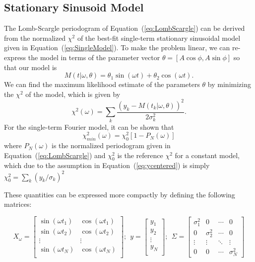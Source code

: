 \documentclass[12pt,preprint]{aastex}
\newcommand{\Eq}[1]{Equation~(\ref{eq:#1})}
\newcommand{\eq}[1]{\Eq{#1}}
\newcommand{\eqlabel}[1]{\label{eq:#1}}
\begin{document}
\subsection{Stationary Sinusoid Model}
The Lomb-Scargle periodogram of \eq{LombScargle} can be derived from the normalized $\chi^2$ of the best-fit single-term stationary sinusoidal model given in \eq{SingleModel}. To make the problem linear, we can re-express the model in terms of the parameter vector $\theta = [A\cos\phi, A\sin\phi]$ so that our model is
\begin{equation}
  \eqlabel{simplemodel}
  M(t|\omega,\theta) = \theta_1\sin(\omega t) + \theta_2\cos(\omega t).
\end{equation}
We can find the maximum likelihood estimate of the parameters $\theta$ by minimizing the $\chi^2$ of the model, which is given by
\begin{equation}
  \chi^2(\omega) = \sum_k \frac{(y_k - M(t_k|\omega,\theta))^2}{2\sigma_k^2}.
\end{equation}
For the single-term Fourier model, it can be shown \citep[See, e.g.][]{ICVG2014} that
\begin{equation}
  \eqlabel{chi2_PN}
  \chi_{min}^2(\omega) = \chi^2_0[1 - P_N(\omega)]
\end{equation}
where $P_N(\omega)$ is the normalized periodogram given in \eq{LombScargle} and $\chi^2_0$ is the reference $\chi^2$ for a constant model, which due to the assumption in \eq{ycentered} is simply $\chi^2_0 = \sum_k (y_k/\sigma_k)^2$

These quantities can be expressed more compactly by defining the following matrices:

\begin{equation}
X_\omega = \left[
\begin{array}{cc}
\sin(\omega t_1) & \cos(\omega t_1)\\
\sin(\omega t_2) & \cos(\omega t_2)\\
\vdots & \vdots \\
\sin(\omega t_N) & \cos(\omega t_N)\\
\end{array}
\right];~~
y = \left[
\begin{array}{c}
y_1 \\
y_2\\
\vdots \\
y_N\\
\end{array}
\right];~~
\Sigma = \left[
\begin{array}{cccc}
\sigma_1^2 & 0 &  \cdots & 0\\
0 & \sigma_2^2 &  \cdots & 0\\
\vdots & \vdots &  \ddots & \vdots\\
0 & 0 &  \cdots & \sigma_N^2
\end{array}
\right]
\end{equation}
\end{document}
